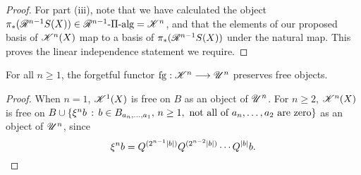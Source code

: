 \documentclass[11pt]{article}
\newcommand{\RestLie}[1]{\mathsf{r}{\scrL}^{#1}}%
\newcommand{\PRLie}[1]{\scrR^{#1}}%
\newcommand{\LL}[1]{{\scrK}^{#1}}%
\newcommand{\GR}[1]{\scrV^{#1}}%
\newcommand{\nontop}[1]{\scrU^{#1}}%
\newcommand{\PiAlg}[1]{#1\textup{-$\Pi$-alg}}
\newcommand{\admis}[1]{\mathrm{adm}(#1)}%
\newcommand{\iteratedrestn}[2]{\xi^{#2}{#1}}
\newcommand{\forget}{\mathrm{fg}}
\newcommand{\Fr}[1]{#1}%
\newcommand{\LambdaOp}{Q}
\begin{document}
\begin{CategoriesOfInterest}
\begin{proof}
For part (iii), note that we have calculated the object $\pi_*(\Fr{\PRLie{n-1}}S(X))\in\PiAlg{\PRLie{n-1}}=\LL{n}$, and that the elements of our proposed basis of $\Fr{\LL{n}}(X)$ map to a basis of $\pi_*(\Fr{\PRLie{n-1}}S(X))$ under the natural map. This proves the linear independence statement we require.
%
\end{proof}
\begin{cor*}
For all $n\geq 1$, the forgetful functor $\forget:\LL{n}\to\nontop{n}$ preserves free objects.
\end{cor*}
\begin{proof}
When $n=1$, $\Fr{\LL{1}}(X)$ is free on $B$ as an object of $\nontop{n}$. For $n\geq2$, $\Fr{\LL{n}}(X)$  is free on $B\cup \{\iteratedrestn{b}{n}\,:\,b\in B_{a_{n},\ldots,a_1},\,n\geq1,\textup{ not all of $a_n,\ldots,a_2$ are zero}\}$ as an object of $\nontop{n}$, since
\[\iteratedrestn{b}{n}=\LambdaOp^{(2^{n-1}|b|)}\LambdaOp^{(2^{n-2}|b|)}\cdots \LambdaOp^{|b|}b.\qedhere\]

\end{proof}
\end{CategoriesOfInterest}
\end{document}

